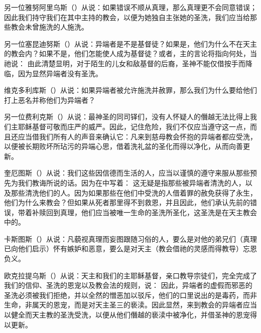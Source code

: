 另一位雅努阿里乌斯（）从说：如果错误不顺从真理，那么真理更不会同意错误；因此我们持守我们在其中主持的教会，以便为她独自主张她的圣洗，我们应当给那些教会未曾施洗的人施洗。\par

另一位塞昆迪努斯（）从说：异端者是不是基督徒？如果是，他们为什么不在天主的教会内？如果不是，他们怎能使人成为基督徒？或者，主的言论将指向何处，当祂说： 由此清楚显明，对于陌生的儿女和敌基督的后裔，圣神不能仅借按手而降临，因为显然异端者没有圣洗。\par

维克多利库斯（）从说：如果异端者被允许施洗并赦罪，那么我们为什么要给他们打上恶名并称他们为异端者？\par

另一位费利克斯（）从说：最神圣的同司铎们，没有人怀疑人的僭越无法比得上我们主耶稣基督可敬而庄严的威严。因此，记住危险，我们不仅应当遵守这一点，而且还应当借我们所有人的声音来确认它：凡来到慈母教会怀抱的异端者都应受洗，以便被长期败坏所玷污的异端心思，借着洗礼盆的圣化而得以净化，从而向善更新。\par

奎厄图斯（）从说：我们这些因信德而生活的人，应当以谨慎的遵守来服从那些预先为我们教诲所说的话。因为在中写着： 这无疑是指那些被异端者清洗的人，以及那些清洗他们的人。因为如果那些在他们中受洗的人借着罪的赦免获得了永生，他们为什么来教会？但如果从死者那里得不到救恩，并且因此，他们承认先前的错误，带着补赎回到真理，他们应当被唯一生命的圣洗所圣化，这圣洗是在天主教会中的。\par

卡斯图斯（）从说：凡藐视真理而妄图跟随习俗的人，要么是对他的弟兄们（真理已向他们启示）怀有嫉妒和恶意，要么是对天主（教会借祂的灵感而得教导）忘恩负义。\par

欧克拉提乌斯（）从说：天主和我们的主耶稣基督，亲口教导宗徒们，完全完成了我们的信仰、圣洗的恩宠以及教会法的规则，说： 因此，异端者的虚假而邪恶的圣洗必须被我们拒绝，并以全然的憎恶加以驳斥，他们的口里说出的是毒药，而非生命，非属天的恩宠，而是对天主圣三的亵渎。因此显然，来到教会的异端者应当以健全而天主教的圣洗受洗，以便从他们僭越的亵渎中被净化，并借圣神的恩宠得以更新。\par

